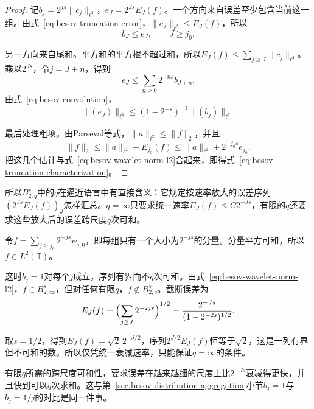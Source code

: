 \begin{proof}
记$b_j=2^{js}\lVert c_j\rVert_{\ell^2}$，$e_J=2^{Js}E_J(f)$。一个方向来自误差至少包含当前这一组。由式~\eqref{eq:besov-truncation-error}，$\lVert c_J\rVert_{\ell^2}\leq E_J(f)$，所以
\[
 b_J\leq e_J,\qquad J\geq j_0 .
\]

另一方向来自尾和。平方和的平方根不超过和，所以$E_J(f)\leq\sum_{j\geq J}\lVert c_j\rVert_{\ell^2}$。乘以$2^{Js}$，令$j=J+n$，得到
\[
 e_J\leq\sum_{n\geq0}2^{-ns}b_{J+n} .
\]
由式~\eqref{eq:besov-convolution}，
\[
 \lVert(e_J)\rVert_{\ell^q}\leq(1-2^{-s})^{-1}\lVert(b_j)\rVert_{\ell^q} .
\]

最后处理粗项。由Parseval等式，$\lVert a\rVert_{\ell^2}\leq\lVert f\rVert_2$，并且
\[
 \lVert f\rVert_2\leq\lVert a\rVert_{\ell^2}+E_{j_0}(f)\leq\lVert a\rVert_{\ell^2}+2^{-j_0s}e_{j_0} .
\]
把这几个估计与式~\eqref{eq:besov-wavelet-norm-l2}合起来，即得式~\eqref{eq:besov-truncation-characterization}。
\end{proof}

所以$B^s_{2,q}$中的$q$在逼近语言中有直接含义：它规定按速率放大的误差序列$(2^{Js}E_J(f))_J$怎样汇总。$q=\infty$只要求统一速率$E_J(f)\leq C2^{-Js}$，有限的$q$还要求这些放大后的误差跨尺度$q$次可和。

\begin{example}[统一速率与跨尺度可和性]
\label{ex:besov-one-coefficient-per-scale}
令$f=\sum_{j\geq j_0}2^{-js}\psi_{j,0}$，即每组只有一个大小为$2^{-js}$的分量。分量平方可和，所以$f\in L^2(\mathbb T)$。

这时$b_j=1$对每个$j$成立，序列有界而不$q$次可和。由式~\eqref{eq:besov-wavelet-norm-l2}，$f\in B^s_{2,\infty}$，但对任何有限$q$，$f\notin B^s_{2,q}$。截断误差为
\[
 E_J(f)=\Bigl(\sum_{j\geq J}2^{-2js}\Bigr)^{1/2}=\frac{2^{-Js}}{(1-2^{-2s})^{1/2}} .
\]

取$s=1/2$，得到$E_J(f)=\sqrt2\,2^{-J/2}$，序列$2^{J/2}E_J(f)$恒等于$\sqrt2$，这是一列有界但不可和的数。所以仅凭统一衰减速率，只能保证$q=\infty$的条件。
\end{example}

有限$q$所需的跨尺度可和性，要求误差在越来越细的尺度上比$2^{-Js}$衰减得更快，并且快到可以$q$次求和。这与第~\ref{sec:besov-distribution-aggregation}小节$b_j=1$与$b_j=1/j$的对比是同一件事。

